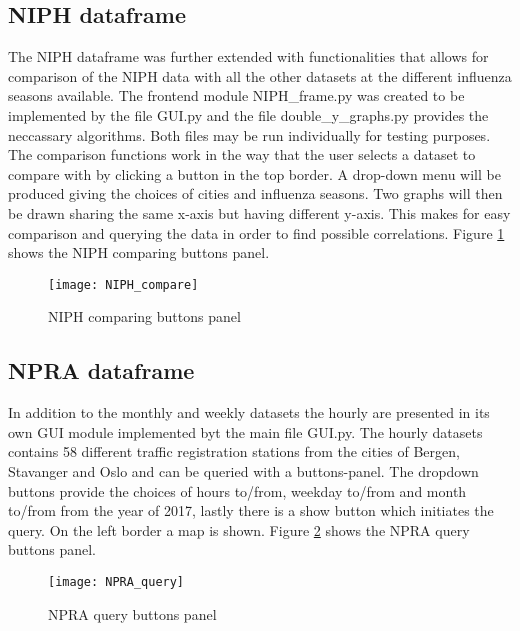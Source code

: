 \subsection{NIPH dataframe}
The NIPH dataframe was further extended with functionalities that allows for comparison of the NIPH data with all the other datasets at the different influenza seasons available. The frontend module NIPH\_frame.py was created to be implemented by the file GUI.py and the file double\_y\_graphs.py provides the neccassary algorithms. Both files may be run individually for testing purposes. The comparison functions work in the way that the user selects a dataset to compare with by clicking a button in the top border. A drop-down menu will be produced giving the choices of cities and influenza seasons. Two graphs will then be drawn sharing the same x-axis but having different y-axis. This makes for easy comparison and querying the data in order to find possible correlations.
Figure \ref{fig:NIPH_compare} shows the NIPH comparing buttons panel.

\begin{figure}[ht]
\texttt{[image: NIPH\_compare]}
\centering
\caption{NIPH comparing buttons panel}
\label{fig:NIPH_compare}
\end{figure}

\subsection{NPRA dataframe}
In addition to the monthly and weekly datasets the hourly are presented in its own GUI module implemented byt the main file GUI.py. The hourly datasets contains 58 different traffic registration stations from the cities of Bergen, Stavanger and Oslo and can be queried with a buttons-panel. The dropdown buttons provide the choices of hours to/from, weekday to/from and month to/from from the year of 2017, lastly there is a show button which initiates the query. On the left border a map is shown.
Figure \ref{fig:NPRA_query} shows the NPRA query buttons panel.

\begin{figure}[ht]
\texttt{[image: NPRA\_query]}
\centering
\caption{NPRA query buttons panel}
\label{fig:NPRA_query}
\end{figure}





